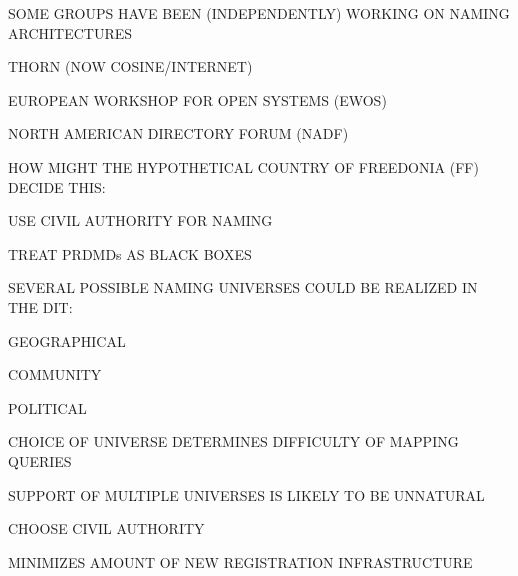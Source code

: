 

\begin{bwslide}

\begin{nrtc}
\item	SOME GROUPS HAVE BEEN (INDEPENDENTLY) WORKING ON NAMING ARCHITECTURES
    \begin{nrtc}
    \item	THORN (NOW COSINE/INTERNET)

    \item	EUROPEAN WORKSHOP FOR OPEN SYSTEMS (EWOS)

    \item	NORTH AMERICAN DIRECTORY FORUM (NADF)
    \end{nrtc}

\item	HOW MIGHT THE HYPOTHETICAL COUNTRY OF FREEDONIA (FF)
	DECIDE THIS:
    \begin{nrtc}
    \item	USE CIVIL AUTHORITY FOR NAMING

    \item	TREAT PRDMDs AS BLACK BOXES
    \end{nrtc}
\end{nrtc}
\end{bwslide}


\begin{bwslide}

\begin{nrtc}
\item	SEVERAL POSSIBLE NAMING UNIVERSES COULD BE REALIZED IN THE DIT:
    \begin{nrtc}
    \item	GEOGRAPHICAL

    \item	COMMUNITY

    \item	POLITICAL
    \end{nrtc}

\item	CHOICE OF UNIVERSE DETERMINES DIFFICULTY OF MAPPING QUERIES

\item	SUPPORT OF MULTIPLE UNIVERSES IS LIKELY TO BE UNNATURAL

\item	CHOOSE CIVIL AUTHORITY
    \begin{nrtc}
    \item	MINIMIZES AMOUNT OF NEW REGISTRATION INFRASTRUCTURE
    \end{nrtc}
\end{nrtc}
\end{bwslide}


